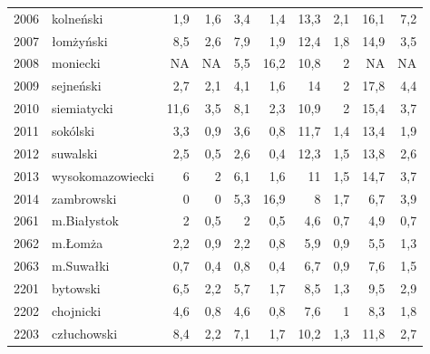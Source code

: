 \begin{center}
\begin{longtable}{lp{3cm}rrrrrrrr}
2006 & kolneński               & 1,9     & 1,6         & 3,4      & 1,4          & 13,3     & 2,1          & 16,1     & 7,2          \\
2007 & łomżyński               & 8,5     & 2,6         & 7,9      & 1,9          & 12,4     & 1,8          & 14,9     & 3,5          \\
2008 & moniecki                & NA      & NA          & 5,5      & 16,2         & 10,8     & 2            & NA       & NA           \\
2009 & sejneński               & 2,7     & 2,1         & 4,1      & 1,6          & 14       & 2            & 17,8     & 4,4          \\
2010 & siemiatycki             & 11,6    & 3,5         & 8,1      & 2,3          & 10,9     & 2            & 15,4     & 3,7          \\
2011 & sokólski                & 3,3     & 0,9         & 3,6      & 0,8          & 11,7     & 1,4          & 13,4     & 1,9          \\
2012 & suwalski                & 2,5     & 0,5         & 2,6      & 0,4          & 12,3     & 1,5          & 13,8     & 2,6          \\
2013 & wysokomazowiecki        & 6       & 2           & 6,1      & 1,6          & 11       & 1,5          & 14,7     & 3,7          \\
2014 & zambrowski              & 0       & 0           & 5,3      & 16,9         & 8        & 1,7          & 6,7      & 3,9          \\
2061 & m.Białystok             & 2       & 0,5         & 2        & 0,5          & 4,6      & 0,7          & 4,9      & 0,7          \\
2062 & m.Łomża                 & 2,2     & 0,9         & 2,2      & 0,8          & 5,9      & 0,9          & 5,5      & 1,3          \\
2063 & m.Suwałki               & 0,7     & 0,4         & 0,8      & 0,4          & 6,7      & 0,9          & 7,6      & 1,5          \\
2201 & bytowski                & 6,5     & 2,2         & 5,7      & 1,7          & 8,5      & 1,3          & 9,5      & 2,9          \\
2202 & chojnicki               & 4,6     & 0,8         & 4,6      & 0,8          & 7,6      & 1            & 8,3      & 1,8          \\
2203 & człuchowski             & 8,4     & 2,2         & 7,1      & 1,7          & 10,2     & 1,3          & 11,8     & 2,7          \\

\end{longtable}
\end{center}

